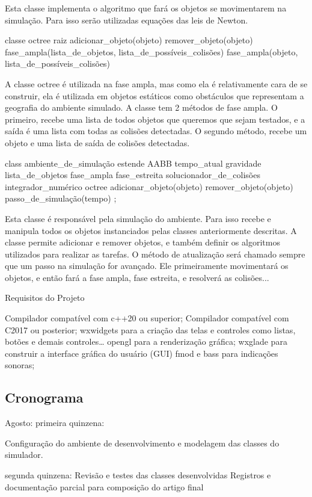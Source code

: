  Esta classe implementa o algoritmo que fará os objetos se movimentarem na simulação. Para isso serão utilizadas equações das leis de Newton.

classe octree
{
raiz
adicionar_objeto(objeto)
remover_objeto(objeto)
fase_ampla(lista_de_objetos, lista_de_possíveis_colisões)
fase_ampla(objeto, lista_de_possíveis_colisões)
}

A classe octree é utilizada na fase ampla, mas como ela é relativamente cara de
se construir, ela é utilizada em objetos estáticos como obstáculos que representam a geografia do ambiente simulado.
A classe tem 2 métodos de fase ampla. O primeiro, recebe uma lista de todos objetos
que queremos que sejam testados, e a saída é uma lista com todas as colisões
detectadas. O segundo método, recebe um objeto e uma lista de saída de colisões detectadas.

class ambiente_de_simulação estende AABB
{
tempo_atual
gravidade
lista_de_objetos
fase_ampla
fase_estreita
solucionador_de_colisões
integrador_numérico
octree
adicionar_objeto(objeto)
remover_objeto(objeto)
passo_de_simulação(tempo)
};

Esta classe é responsável pela simulação do ambiente. Para isso recebe e manipula todos os objetos instanciados pelas classes anteriormente descritas. A classe permite adicionar e remover objetos, e também definir os algoritmos utilizados
para realizar as tarefas.
O método de atualização será chamado sempre que um passo na simulação for avançado.
Ele primeiramente movimentará os objetos, e então fará a fase ampla, fase
estreita, e resolverá as colisões...

Requisitos do Projeto

Compilador compatível com c++20 ou superior;
Compilador compatível com C2017 ou posterior;
wxwidgets para a criação das telas e controles como listas, botões e demais controles…
opengl para a renderização gráfica;
wxglade para construir a interface gráfica do usuário (GUI)
fmod e bass para indicações sonoras;

\subsection{Cronograma}
Agosto:
primeira quinzena:

Configuração do ambiente de desenvolvimento e modelagem das classes do
simulador.

segunda quinzena:
Revisão e testes das classes desenvolvidas
Registros e documentação parcial para composição do artigo final

